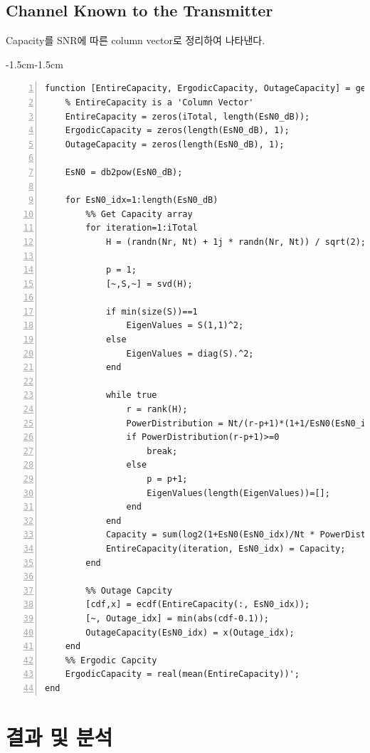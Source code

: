 \documentclass{article}
\begin{document}
\subsection{Channel Known to the Transmitter}
Capacity를 SNR에 따른 column vector로 정리하여 나타낸다.
\begin{adjustwidth}{-1.5cm}{-1.5cm}
\begin{lstlisting}[style=Matlab-editor, frame=single, numbers=left,]
function [EntireCapacity, ErgodicCapacity, OutageCapacity] = getCapcity_CK(Nr, Nt, EsN0_dB, iTotal)
    % EntireCapacity is a 'Column Vector'
    EntireCapacity = zeros(iTotal, length(EsN0_dB));
    ErgodicCapacity = zeros(length(EsN0_dB), 1);
    OutageCapacity = zeros(length(EsN0_dB), 1);
    
    EsN0 = db2pow(EsN0_dB);
    
    for EsN0_idx=1:length(EsN0_dB)
        %% Get Capacity array
        for iteration=1:iTotal
            H = (randn(Nr, Nt) + 1j * randn(Nr, Nt)) / sqrt(2); % Receiver x Transmitter
            
            p = 1;
            [~,S,~] = svd(H);
            
            if min(size(S))==1
                EigenValues = S(1,1)^2;
            else
                EigenValues = diag(S).^2;
            end
            
            while true
                r = rank(H);
                PowerDistribution = Nt/(r-p+1)*(1+1/EsN0(EsN0_idx)*sum(1./EigenValues, 'all')) - Nt/EsN0(EsN0_idx)*(1./EigenValues);
                if PowerDistribution(r-p+1)>=0
                    break;
                else
                    p = p+1;
                    EigenValues(length(EigenValues))=[];
                end
            end
            Capacity = sum(log2(1+EsN0(EsN0_idx)/Nt * PowerDistribution.*EigenValues), 'all');
            EntireCapacity(iteration, EsN0_idx) = Capacity;
        end
        
        %% Outage Capcity
        [cdf,x] = ecdf(EntireCapacity(:, EsN0_idx));
        [~, Outage_idx] = min(abs(cdf-0.1));
        OutageCapacity(EsN0_idx) = x(Outage_idx);
    end
    %% Ergodic Capcity
    ErgodicCapacity = real(mean(EntireCapacity))';
end
\end{lstlisting}
\end{adjustwidth}

\section{결과 및 분석}
\end{document}
